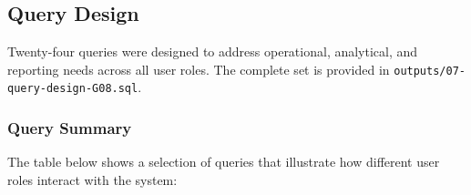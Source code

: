 
\subsection{Query Design}

Twenty-four queries were designed to address operational, analytical, and reporting needs across all user roles. The complete set is provided in \texttt{outputs/07-query-design-G08.sql}.

\subsubsection{Query Summary}

The table below shows a selection of queries that illustrate how different user roles interact with the system:


